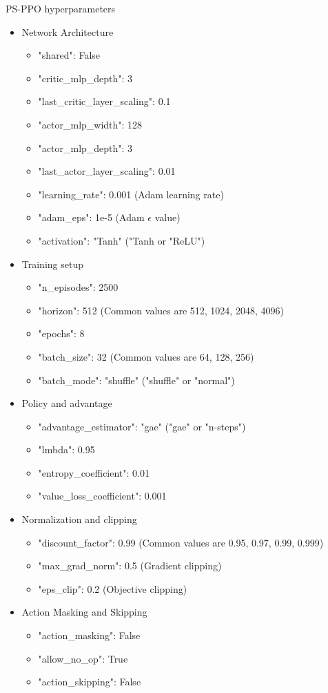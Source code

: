 \documentclass[11pt, a4paper, hidelinks]{report}
\begin{document}
PS-PPO hyperparameters
\begin{itemize}
	\item Network Architecture
	\begin{itemize}
		\item "shared": False
		\item "critic\_mlp\_depth": 3
		\item "last\_critic\_layer\_scaling": 0.1
		\item "actor\_mlp\_width": 128
		\item "actor\_mlp\_depth": 3
		\item "last\_actor\_layer\_scaling": 0.01
		\item "learning\_rate": 0.001 (Adam learning rate)
		\item "adam\_eps": 1e-5 (Adam $\epsilon$ value)
		\item "activation": "Tanh" ("Tanh or "ReLU")
	\end{itemize}
	\item Training setup
	\begin{itemize}
		\item "n\_episodes": 2500
		\item "horizon": 512 (Common values are 512, 1024, 2048, 4096)
		\item "epochs": 8
		\item "batch\_size": 32 (Common values are 64, 128, 256)
		\item "batch\_mode": "shuffle" ("shuffle" or "normal")
	\end{itemize}
	\item Policy and advantage
	\begin{itemize}
		\item "advantage\_estimator": "gae" ("gae" or "n-steps")
		\item "lmbda": 0.95
		\item "entropy\_coefficient": 0.01
		\item "value\_loss\_coefficient": 0.001
	\end{itemize}
	\item Normalization and clipping
	\begin{itemize}
		\item "discount\_factor": 0.99 (Common values are 0.95, 0.97, 0.99, 0.999)
		\item "max\_grad\_norm": 0.5 (Gradient clipping)
		\item "eps\_clip": 0.2 (Objective clipping)
	\end{itemize}
	\item Action Masking and Skipping
	\begin{itemize}
		\item "action\_masking": False
		\item "allow\_no\_op": True
		\item "action\_skipping": False
	\end{itemize}
\end{itemize}
\end{document}
